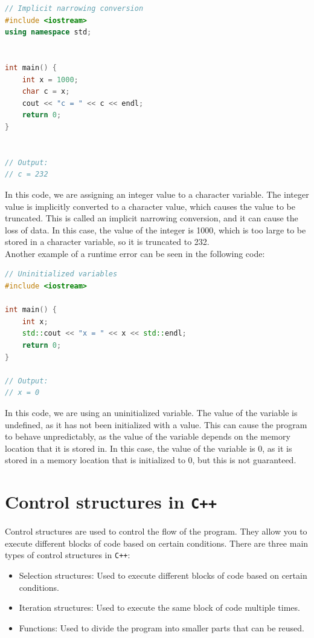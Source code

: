 \begin{lstlisting}[language=C++]
// Implicit narrowing conversion
#include <iostream>
using namespace std;


int main() {
    int x = 1000;
    char c = x;
    cout << "c = " << c << endl;
    return 0;
}


// Output:
// c = 232
\end{lstlisting}

In this code, we are assigning an integer value to a character variable. The integer value is implicitly converted
to a character value, which causes the value to be truncated. This is called an implicit narrowing conversion, and
it can cause the loss of data. In this case, the value of the integer is 1000, which is too large to be stored in
a character variable, so it is truncated to 232.\\

Another example of a runtime error can be seen in the following code:

\begin{lstlisting}[language=C++]
// Uninitialized variables
#include <iostream>

int main() {
    int x;
    std::cout << "x = " << x << std::endl;
    return 0;
}

// Output:
// x = 0
\end{lstlisting}

In this code, we are using an uninitialized variable. The value of the variable is undefined, as it has not been
initialized with a value. This can cause the program to behave unpredictably, as the value of the variable depends
on the memory location that it is stored in. In this case, the value of the variable is 0, as it is stored in a
memory location that is initialized to 0, but this is not guaranteed.\\


\section{Control structures in \texttt{C++}}

Control structures are used to control the flow of the program. They allow you to execute different blocks of code
based on certain conditions. There are three main types of control structures in \texttt{C++}:

\begin{itemize}
    \item Selection structures: Used to execute different blocks of code based on certain conditions.
    \item Iteration structures: Used to execute the same block of code multiple times.
    \item Functions: Used to divide the program into smaller parts that can be reused.
\end{itemize}


